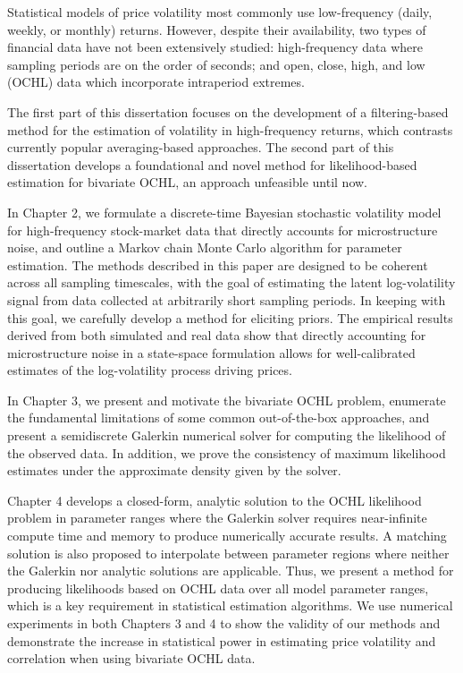 
Statistical models of price volatility most commonly use low-frequency
(daily, weekly, or monthly) returns. However, despite their
availability, two types of financial data have not been extensively
studied: high-frequency data where sampling periods are on the order
of seconds; and open, close, high, and low (OCHL) data which
incorporate intraperiod extremes.

The first part of this dissertation focuses on the development of a
filtering-based method for the estimation of volatility in high-frequency
returns, which contrasts currently popular averaging-based
approaches. The second part of this dissertation develops a
foundational and novel method for likelihood-based estimation for
bivariate OCHL, an approach unfeasible until now.

In Chapter 2, we formulate a discrete-time Bayesian stochastic
volatility model for high-frequency stock-market data that directly
accounts for microstructure noise, and outline a Markov chain Monte
Carlo algorithm for parameter estimation. The methods described in
this paper are designed to be coherent across all sampling timescales,
with the goal of estimating the latent log-volatility signal from data
collected at arbitrarily short sampling periods. In keeping with this
goal, we carefully develop a method for eliciting priors. The
empirical results derived from both simulated and real data show that
directly accounting for microstructure noise in a state-space formulation
allows for well-calibrated estimates of the log-volatility process
driving prices.

In Chapter 3, we present and motivate the bivariate OCHL problem,
enumerate the fundamental limitations of some common out-of-the-box
approaches, and present a semidiscrete Galerkin numerical solver for
computing the likelihood of the observed data. In addition, we prove
the consistency of maximum likelihood estimates under the approximate
density given by the solver.

Chapter 4 develops a closed-form, analytic solution to the OCHL
likelihood problem in parameter ranges where the Galerkin solver
requires near-infinite compute time and memory to produce numerically
accurate results. A matching solution is also proposed to interpolate
between parameter regions where neither the Galerkin nor analytic
solutions are applicable. Thus, we present a method for producing
likelihoods based on OCHL data over all model parameter ranges, which
is a key requirement in statistical estimation algorithms. We use
numerical experiments in both Chapters 3 and 4 to show the validity of
our methods and demonstrate the increase in statistical power in
estimating price volatility and correlation when using bivariate OCHL
data.